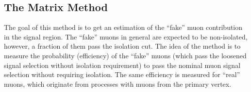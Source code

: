 % 

\subsection{The Matrix Method}
\label{subsec:matrix_method}
The goal of this method is to get an estimation of the ``fake'' muon contribution in the signal region.
The ``fake'' muons in general are expected to be non-isolated, however, a fraction of them pass the isolation cut. 
The idea of the method is to measure the probability (efficiency) of the ``fake'' muons
(which pass the loosened signal selection without isolation requirement) to pass the nominal muon signal selection without requiring isolation.
The same efficiency is measured for ``real'' muons, which originate from processes with muons from the primary vertex.

